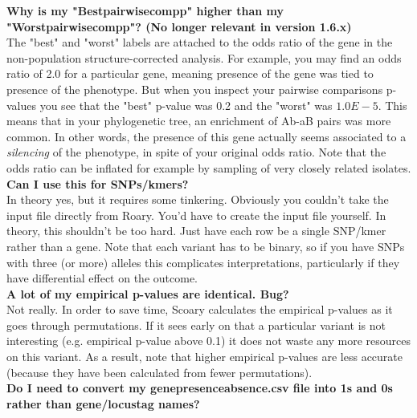 \documentclass{article}
\begin{document}
    \textbf{Why is my "Best\textunderscore pairwise\textunderscore comp\textunderscore p" higher than my "Worst\textunderscore pairwise\textunderscore comp\textunderscore p"? (No longer relevant in version 1.6.x)}\\

    The "best" and "worst" labels are attached to the odds ratio of the gene in the non-population structure-corrected analysis. For example, you may find an odds ratio of 2.0 for a particular gene, meaning presence of the gene was tied to presence of the phenotype. But when you inspect your pairwise comparisons p-values you see that the "best" p-value was 0.2 and the "worst" was $1.0E-5$. This means that in your phylogenetic tree, an enrichment of Ab-aB pairs was more common. In other words, the presence of this gene actually seems associated to a \textit{silencing} of the phenotype, in spite of your original odds ratio. Note that the odds ratio can be inflated for example by sampling of very closely related isolates. \\
    
    \textbf{Can I use this for SNPs/kmers?} \\

    In theory yes, but it requires some tinkering. Obviously you couldn't take the input file directly from Roary. You'd have to create the input file yourself. In theory, this shouldn't be too hard. Just have each row be a single SNP/kmer rather than a gene. Note that each variant has to be binary, so if you have SNPs with three (or more) alleles this complicates interpretations, particularly if they have differential effect on the outcome. \\
    
    \textbf{A lot of my empirical p-values are identical. Bug?} \\

    Not really. In order to save time, Scoary calculates the empirical p-values as it goes through permutations. If it sees early on that a particular variant is not interesting (e.g. empirical p-value above 0.1) it does not waste any more resources on this variant. As a result, note that higher empirical p-values are less accurate (because they have been calculated from fewer permutations). \\
    
    \textbf{Do I need to convert my gene\textunderscore presence\textunderscore absence.csv file into 1s and 0s rather than gene/locus\textunderscore tag names?} \\
\end{document}
